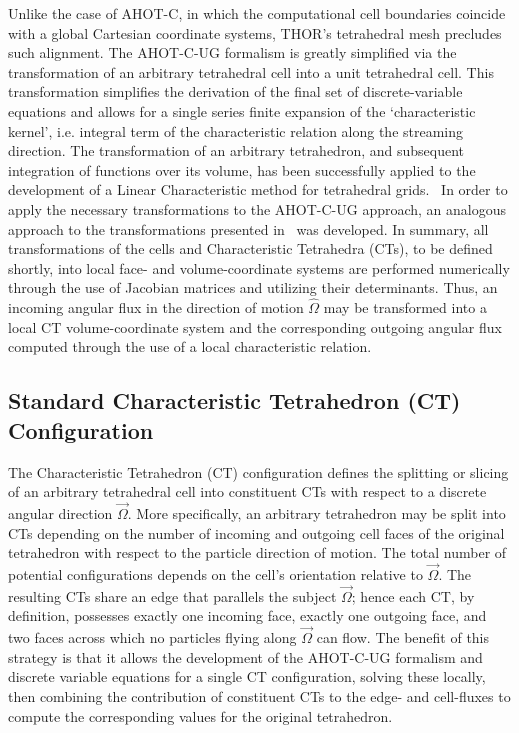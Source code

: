 Unlike the case of AHOT-C, in which the computational cell boundaries coincide with a global Cartesian coordinate systems, THOR's tetrahedral mesh precludes such alignment. The AHOT-C-UG formalism is greatly simplified via the transformation of an arbitrary tetrahedral cell into a unit tetrahedral cell. This transformation simplifies the derivation of the final set of discrete-variable equations and allows for a single series finite expansion of the ‘characteristic kernel’, i.e. integral term of the characteristic relation along the streaming direction. The transformation of an arbitrary tetrahedron, and subsequent integration of functions over its volume, has been successfully applied to the development of a Linear Characteristic method for tetrahedral grids.~\cite{Mathews2000} In order to apply the necessary transformations to the AHOT-C-UG approach, an analogous approach to the transformations presented in~\cite{Mathews2000} was developed. In summary, all transformations of the cells and Characteristic Tetrahedra (CTs), to be defined shortly, into local face- and volume-coordinate systems are performed numerically through the use of Jacobian matrices and utilizing their determinants. Thus, an incoming angular flux in the direction of motion $\hat{\Omega}$ may be transformed into a local CT volume-coordinate system and the corresponding outgoing angular flux computed through the use of a local characteristic relation.


\subsection{Standard Characteristic Tetrahedron (CT) Configuration}

The Characteristic Tetrahedron (CT) configuration defines the splitting or slicing of an arbitrary tetrahedral cell into constituent CTs with respect to a discrete angular direction $\vec{\Omega}$. More specifically, an arbitrary tetrahedron may be split into CTs depending on the number of incoming and outgoing cell faces of the original tetrahedron with respect to the particle direction of motion. The total number of potential configurations depends on the cell's orientation relative to $\vec{\Omega}$. The resulting CTs share an edge that parallels the subject $\vec{\Omega}$; hence each CT, by definition, possesses exactly one incoming face, exactly one outgoing face, and two faces across which no particles flying along $\vec{\Omega}$ can flow. The benefit of this strategy is that it allows the development of the AHOT-C-UG formalism and discrete variable equations for a single CT configuration, solving these locally, then combining the contribution of constituent CTs to the edge- and cell-fluxes to compute the corresponding values for the original tetrahedron.

